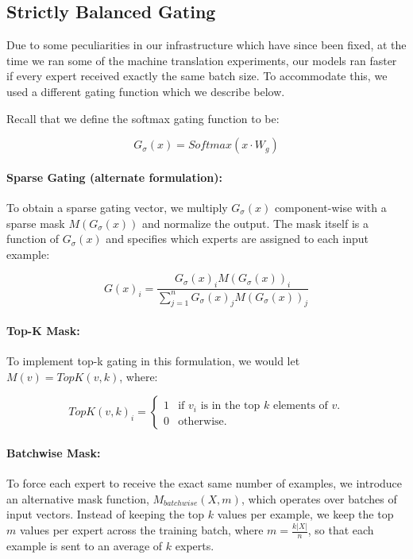 \documentclass{article} %
\begin{document}
\subsection{Strictly Balanced Gating}\label{sec:batchwisemask} 

Due to some peculiarities in our infrastructure which have since been fixed, at the time we ran some of the machine translation experiments, our models ran faster if every expert received exactly the same batch size.  To accommodate this, we used a different gating function which we describe below.  

Recall that we define the softmax gating function to be:

\begin{equation}\label{eq:softmax}
G_\sigma(x) = Softmax(x \cdot W_g)
\end{equation}

\paragraph{Sparse Gating (alternate formulation):} To obtain a sparse gating vector, we multiply $G_\sigma(x)$ component-wise with a sparse mask $M(G_\sigma(x))$ and normalize the output. The mask itself is a function of $G_\sigma(x)$ and specifies which experts are assigned to each input example: 

\begin{equation}\label{eq:g_top_k}
G(x)_i = \frac{G_\sigma(x)_i M(G_\sigma(x))_i}{\sum_{j=1}^{n} G_\sigma(x)_j M(G_\sigma(x))_j }
\end{equation}

\paragraph{Top-K Mask:} To implement top-k gating in this formulation, we would let $M(v) = TopK(v, k)$, where:

\begin{equation}\label{eq:top_k}
TopK(v, k)_i = \begin{cases}
            1 & \text{if $v_i$ is in the top $k$ elements of $v$.} \\
            0 & \text{otherwise.}
        \end{cases}
\end{equation}

\paragraph{Batchwise Mask:} To force each expert to receive the exact same number of examples, we introduce an alternative mask function, $M_{batchwise}(X, m)$, which operates over batches of input vectors.   Instead of keeping the top $k$ values per example, we keep the top $m$ values per expert across the training batch, where $m=\frac{k|X|}{n}$, so that each example is sent to an average of $k$ experts.
\end{document}
